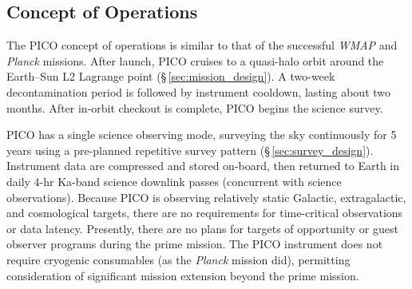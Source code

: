 \subsection{Concept of Operations}
\label{sec:operations} %
%

%
The PICO concept of operations is similar to that of the successful
\textit{WMAP} \citep{Bennett2003} and \textit{Planck} \citep{Tauber2010} missions. After launch,
PICO cruises to a quasi-halo orbit around the Earth--Sun L2 Lagrange point
(\S\,\ref{sec:mission_design}). A two-week decontamination period is followed by
instrument cooldown, lasting about two months. After in-orbit checkout is complete, PICO begins
the science survey.

PICO has a single science observing mode, surveying the sky
continuously for 5 years using a pre-planned repetitive survey pattern
(\S\,\ref{sec:survey_design}). Instrument data are compressed and stored on-board, then
returned to Earth in daily 4-hr Ka-band science downlink passes
(concurrent with science observations). Because PICO is observing
relatively static Galactic, extragalactic, and cosmological targets,
there are no requirements for time-critical observations or data
latency. Presently, there are no plans for targets of opportunity or
guest observer programs during the prime mission. The PICO instrument
does not require cryogenic consumables (as the \textit{Planck} mission did),
permitting consideration of significant mission extension beyond the prime
mission.


